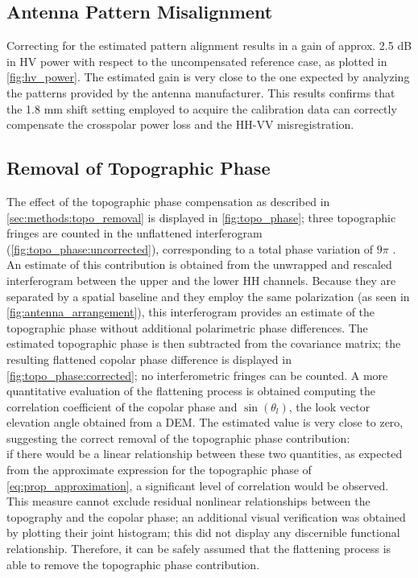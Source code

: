 \subsection{Antenna Pattern Misalignment}\label{sec:discussion:misalignment}
Correcting for the estimated pattern alignment results in a gain of approx. 2.5 dB  in HV power with respect to the uncompensated reference case, as plotted in \autoref{fig:hv_power}. The estimated gain is very close to the one expected by analyzing the patterns provided by the antenna manufacturer. This results confirms that the 1.8 mm shift setting employed to acquire the calibration data can correctly compensate the crosspolar power loss and the HH-VV misregistration.
\subsection{Removal of Topographic Phase}
The effect of the topographic phase compensation as described in \autoref{sec:methods:topo_removal} is displayed in \autoref{fig:topo_phase};
three topographic fringes are counted in the unflattened interferogram (\autoref{fig:topo_phase:uncorrected}), corresponding to a total phase variation of $9 \pi$ . An estimate of this contribution is obtained from the unwrapped and rescaled interferogram between the upper and the lower HH channels. Because they are separated by a spatial baseline and they employ the same polarization (as seen in \autoref{fig:antenna_arrangement}), this interferogram provides an estimate of the topographic phase without additional polarimetric phase differences. The estimated topographic phase is then subtracted from the covariance matrix; the resulting flattened copolar phase difference is displayed in \autoref{fig:topo_phase:corrected}; no interferometric fringes can be counted. A more quantitative evaluation of the flattening process is obtained computing the correlation coefficient of the copolar phase and $\sin{\left(\theta_l\right)}$, the look vector elevation angle obtained from a DEM. The estimated value is very close to zero, suggesting the correct removal of the topographic phase contribution:\\ if there would be a linear relationship between these two quantities, as expected from the approximate  expression for the topographic phase of \eqref{eq:prop_approximation}, a significant level of correlation would be observed. This measure cannot exclude  residual nonlinear relationships between the topography and the copolar phase; an additional visual verification was obtained by plotting their joint histogram; this did  not display any discernible functional relationship. Therefore, it can be safely assumed that the flattening process is able to remove the topographic phase contribution.
